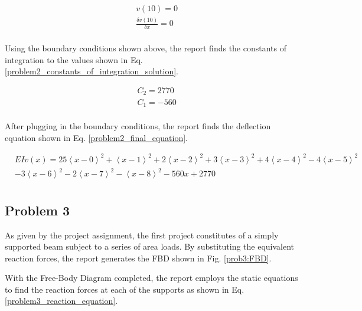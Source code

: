 \documentclass[a4paper]{article}
\begin{document}
\begin{equation}
\begin{split}
	& v(10) = 0 \\
	& \frac{\delta v(10)}{\delta x} = 0 \\
\end{split}
\label{problem2_constants_of_integration}
\end{equation}

Using the boundary conditions shown above, the report finds the constants of integration to the values shown in Eq. \ref{problem2_constants_of_integration_solution}.

\begin{equation}
\begin{split}
	& C_2 = 2770 \\
	& C_1 = -560 \\
\end{split}
\label{problem2_constants_of_integration_solution}
\end{equation}

After plugging in the boundary conditions, the report finds the deflection equation shown in Eq. \ref{problem2_final_equation}.

\begin{equation}
\begin{split}
  & EI v(x) = 25\left<x-0\right>^2 + \left<x-1\right>^2 + 2\left<x-2\right>^2 + 3\left<x-3\right>^2 + 4\left<x-4\right>^2  -  4\left<x-5\right>^2 \\
& - 3\left<x-6\right>^2  -  2\left<x-7\right>^2 - \left<x-8\right>^2 - 560 x + 2770 \\
\end{split}
\label{problem2_final_equation}
\end{equation}



\subsection{Problem 3}

As given by the project assignment, the first project constitutes of a simply supported beam subject to a series of area loads. By substituting the equivalent reaction forces, the report generates the FBD shown in Fig. \ref{prob3:FBD}.

With the Free-Body Diagram completed, the report employs the static equations to find the reaction forces at each of the supports as shown in Eq. \ref{problem3_reaction_equation}.
\end{document}
